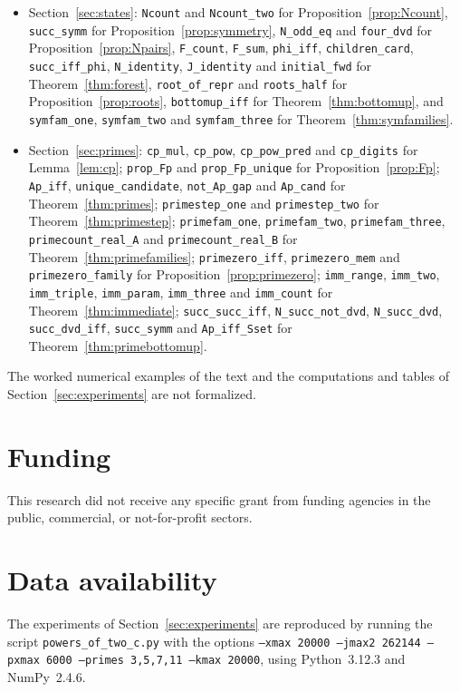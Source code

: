 \documentclass[11pt]{amsart}
\theoremstyle{definition}
\begin{document}
\begin{itemize}
\item Section~\ref{sec:states}: \texttt{Ncount} and \texttt{Ncount\_two} for Proposition~\ref{prop:Ncount}, \texttt{succ\_symm} for Proposition~\ref{prop:symmetry}, \texttt{N\_odd\_eq} and \texttt{four\_dvd} for Proposition~\ref{prop:Npairs}, \texttt{F\_count}, \texttt{F\_sum}, \texttt{phi\_iff}, \texttt{children\_card}, \texttt{succ\_iff\_phi}, \texttt{N\_identity}, \texttt{J\_identity} and \texttt{initial\_fwd} for Theorem~\ref{thm:forest}, \texttt{root\_of\_repr} and \texttt{roots\_half} for Proposition~\ref{prop:roots}, \texttt{bottomup\_iff} for Theorem~\ref{thm:bottomup}, and \texttt{symfam\_one}, \texttt{symfam\_two} and \texttt{symfam\_three} for Theorem~\ref{thm:symfamilies}.
\item Section~\ref{sec:primes}: \texttt{cp\_mul}, \texttt{cp\_pow}, \texttt{cp\_pow\_pred} and \texttt{cp\_digits} for Lemma~\ref{lem:cp}; \texttt{prop\_Fp} and \texttt{prop\_Fp\_unique} for Proposition~\ref{prop:Fp}; \texttt{Ap\_iff}, \texttt{unique\_candidate}, \texttt{not\_Ap\_gap} and \texttt{Ap\_cand} for Theorem~\ref{thm:primes}; \texttt{primestep\_one} and \texttt{primestep\_two} for Theorem~\ref{thm:primestep}; \texttt{primefam\_one}, \texttt{primefam\_two}, \texttt{primefam\_three}, \texttt{primecount\_real\_A} and \texttt{primecount\_real\_B} for Theorem~\ref{thm:primefamilies}; \texttt{primezero\_iff}, \texttt{primezero\_mem} and \texttt{primezero\_family} for Proposition~\ref{prop:primezero}; \texttt{imm\_range}, \texttt{imm\_two}, \texttt{imm\_triple}, \texttt{imm\_param}, \texttt{imm\_three} and \texttt{imm\_count} for Theorem~\ref{thm:immediate}; \texttt{succ\_succ\_iff}, \texttt{N\_succ\_not\_dvd}, \texttt{N\_succ\_dvd}, \texttt{succ\_dvd\_iff}, \texttt{succ\_symm} and \texttt{Ap\_iff\_Sset} for Theorem~\ref{thm:primebottomup}.
\end{itemize}
The worked numerical examples of the text and the computations and tables of Section~\ref{sec:experiments} are not formalized.

\section*{Funding}
This research did not receive any specific grant from funding agencies in the public, commercial, or not-for-profit sectors.

\section*{Data availability}
The experiments of Section~\ref{sec:experiments} are reproduced by running the script \texttt{powers\_of\_two\_c.py} with the options \texttt{--xmax 20000 --jmax2 262144 --pxmax 6000 --primes 3,5,7,11 --kmax 20000}, using Python~3.12.3 and NumPy~2.4.6.
\end{document}
